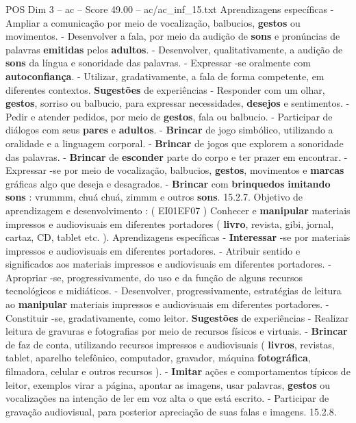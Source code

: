 \begin{textsample}{POS Dim 3 – ac – Score 49.00 – ac/ac\_inf\_15.txt}
Aprendizagens específicas - Ampliar a comunicação por meio de vocalização, balbucios, \textbf{gestos} ou movimentos. - Desenvolver a fala, por meio da audição de \textbf{sons} e pronúncias de palavras \textbf{emitidas} pelos \textbf{adultos}. - Desenvolver, qualitativamente, a audição de \textbf{sons} da língua e sonoridade das palavras. - Expressar -se oralmente com \textbf{autoconfiança}. - Utilizar, gradativamente, a fala de forma competente, em diferentes contextos. \textbf{Sugestões} de experiências - Responder com um olhar, \textbf{gestos}, sorriso ou balbucio, para expressar necessidades, \textbf{desejos} e sentimentos. - Pedir e atender pedidos, por meio de \textbf{gestos}, fala ou balbucio. - Participar de diálogos com seus \textbf{pares} e \textbf{adultos}. - \textbf{Brincar} de jogo simbólico, utilizando a oralidade e a linguagem corporal. - \textbf{Brincar} de jogos que explorem a sonoridade das palavras. - \textbf{Brincar} de \textbf{esconder} parte do corpo e ter prazer em encontrar. - Expressar -se por meio de vocalização, balbucios, \textbf{gestos}, movimentos e \textbf{marcas} gráficas algo que deseja e desagrados. - \textbf{Brincar} com \textbf{brinquedos} \textbf{imitando} \textbf{sons} : vrummm, chuá chuá, zimmm e outros \textbf{sons}. 15.2.7.
Objetivo de aprendizagem e desenvolvimento : ( EI01EF07 ) Conhecer e \textbf{manipular} materiais impressos e audiovisuais em diferentes portadores ( \textbf{livro}, revista, gibi, jornal, cartaz, CD, tablet etc. ).
Aprendizagens específicas - \textbf{Interessar} -se por materiais impressos e audiovisuais em diferentes portadores. - Atribuir sentido e significados aos materiais impressos e audiovisuais em diferentes portadores. - Apropriar -se, progressivamente, do uso e da função de alguns recursos tecnológicos e midiáticos. - Desenvolver, progressivamente, estratégias de leitura ao \textbf{manipular} materiais impressos e audiovisuais em diferentes portadores. - Constituir -se, gradativamente, como leitor. \textbf{Sugestões} de experiências - Realizar leitura de gravuras e fotografias por meio de recursos físicos e virtuais. - \textbf{Brincar} de faz de conta, utilizando recursos impressos e audiovisuais ( \textbf{livros}, revistas, tablet, aparelho telefônico, computador, gravador, máquina \textbf{fotográfica}, filmadora, celular e outros recursos ). - \textbf{Imitar} ações e comportamentos típicos de leitor, exemplos virar a página, apontar as imagens, usar palavras, \textbf{gestos} ou vocalizações na intenção de ler em voz alta o que está escrito. - Participar de gravação audiovisual, para posterior apreciação de suas falas e imagens. 15.2.8.

\end{textsample}
